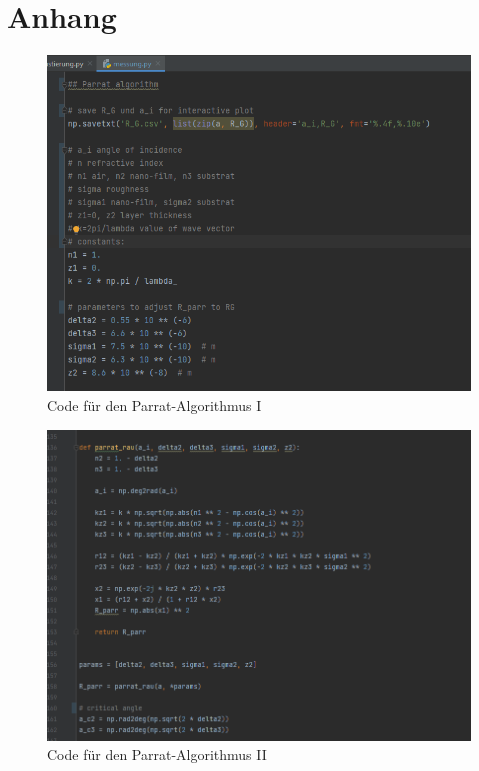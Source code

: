 \newpage
\section{Anhang}
\label{sec:anhang}
\begin{figure}[h!]
  \centering
  \includegraphics[scale=0.7]{fig/parrat1.png}
  \caption{Code für den Parrat-Algorithmus I}
  \label{abb:mess1}
\end{figure}
\begin{figure}[h!]
  \centering
  \includegraphics[scale=0.5]{fig/parrat2.png}
  \caption{Code für den Parrat-Algorithmus II}
  \label{abb:mess2}
\end{figure}
